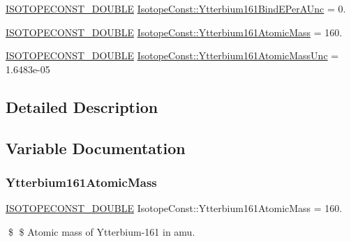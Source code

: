 \begin{DoxyCompactItemize}
\mbox{\hyperlink{group___isotope_const-_macros_ga8f45a7272ce02c0b4c65c44636ed719a}{I\+S\+O\+T\+O\+P\+E\+C\+O\+N\+S\+T\+\_\+\+D\+O\+U\+B\+LE}} \mbox{\hyperlink{group___isotope_const-_ytterbium-_yb161_ga8f271ddc45841b9b5ceca62d2ef98d5d}{Isotope\+Const\+::\+Ytterbium161\+Bind\+E\+Per\+A\+Unc}} = 0.
\item 
\mbox{\hyperlink{group___isotope_const-_macros_ga8f45a7272ce02c0b4c65c44636ed719a}{I\+S\+O\+T\+O\+P\+E\+C\+O\+N\+S\+T\+\_\+\+D\+O\+U\+B\+LE}} \mbox{\hyperlink{group___isotope_const-_ytterbium-_yb161_ga87369fca11a704e954109034556b77b8}{Isotope\+Const\+::\+Ytterbium161\+Atomic\+Mass}} = 160.
\item 
\mbox{\hyperlink{group___isotope_const-_macros_ga8f45a7272ce02c0b4c65c44636ed719a}{I\+S\+O\+T\+O\+P\+E\+C\+O\+N\+S\+T\+\_\+\+D\+O\+U\+B\+LE}} \mbox{\hyperlink{group___isotope_const-_ytterbium-_yb161_ga09ae0511eb78f291cde382dc1dae503c}{Isotope\+Const\+::\+Ytterbium161\+Atomic\+Mass\+Unc}} = 1.\+6483e-\/05
\end{DoxyCompactItemize}


\subsection{Detailed Description}


\subsection{Variable Documentation}
\mbox{\label{group___isotope_const-_ytterbium-_yb161_ga87369fca11a704e954109034556b77b8}} 
\subsubsection{\texorpdfstring{Ytterbium161\+Atomic\+Mass}{Ytterbium161AtomicMass}}
{\footnotesize\ttfamily \mbox{\hyperlink{group___isotope_const-_macros_ga8f45a7272ce02c0b4c65c44636ed719a}{I\+S\+O\+T\+O\+P\+E\+C\+O\+N\+S\+T\+\_\+\+D\+O\+U\+B\+LE}} Isotope\+Const\+::\+Ytterbium161\+Atomic\+Mass = 160.}

\$ \$ Atomic mass of Ytterbium-\/161 in amu. \mbox{\label{group___isotope_const-_ytterbium-_yb161_ga09ae0511eb78f291cde382dc1dae503c}} 
